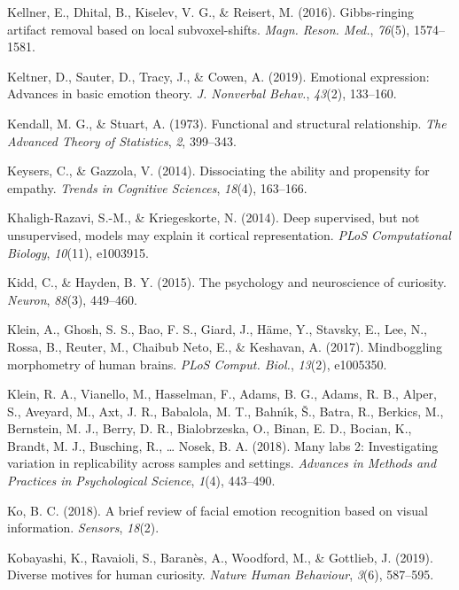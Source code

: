 \documentclass[11pt,american,a4paper,oneside,]{memoir} %
\begin{document}
\leavevmode\hypertarget{ref-Kellner2016-xb}{}%
Kellner, E., Dhital, B., Kiselev, V. G., \& Reisert, M. (2016). Gibbs-ringing artifact removal based on local subvoxel-shifts. \emph{Magn. Reson. Med.}, \emph{76}(5), 1574--1581.

\leavevmode\hypertarget{ref-Keltner2019-tm}{}%
Keltner, D., Sauter, D., Tracy, J., \& Cowen, A. (2019). Emotional expression: Advances in basic emotion theory. \emph{J. Nonverbal Behav.}, \emph{43}(2), 133--160.

\leavevmode\hypertarget{ref-kendall1973functional}{}%
Kendall, M. G., \& Stuart, A. (1973). Functional and structural relationship. \emph{The Advanced Theory of Statistics}, \emph{2}, 399--343.

\leavevmode\hypertarget{ref-keysers2014dissociating}{}%
Keysers, C., \& Gazzola, V. (2014). Dissociating the ability and propensity for empathy. \emph{Trends in Cognitive Sciences}, \emph{18}(4), 163--166.

\leavevmode\hypertarget{ref-khaligh2014deep}{}%
Khaligh-Razavi, S.-M., \& Kriegeskorte, N. (2014). Deep supervised, but not unsupervised, models may explain it cortical representation. \emph{PLoS Computational Biology}, \emph{10}(11), e1003915.

\leavevmode\hypertarget{ref-kidd2015psychology}{}%
Kidd, C., \& Hayden, B. Y. (2015). The psychology and neuroscience of curiosity. \emph{Neuron}, \emph{88}(3), 449--460.

\leavevmode\hypertarget{ref-Klein2017-su}{}%
Klein, A., Ghosh, S. S., Bao, F. S., Giard, J., Häme, Y., Stavsky, E., Lee, N., Rossa, B., Reuter, M., Chaibub Neto, E., \& Keshavan, A. (2017). Mindboggling morphometry of human brains. \emph{PLoS Comput. Biol.}, \emph{13}(2), e1005350.

\leavevmode\hypertarget{ref-Klein2018-un}{}%
Klein, R. A., Vianello, M., Hasselman, F., Adams, B. G., Adams, R. B., Alper, S., Aveyard, M., Axt, J. R., Babalola, M. T., Bahnı́k, Š., Batra, R., Berkics, M., Bernstein, M. J., Berry, D. R., Bialobrzeska, O., Binan, E. D., Bocian, K., Brandt, M. J., Busching, R., \ldots{} Nosek, B. A. (2018). Many labs 2: Investigating variation in replicability across samples and settings. \emph{Advances in Methods and Practices in Psychological Science}, \emph{1}(4), 443--490.

\leavevmode\hypertarget{ref-Ko2018-rv}{}%
Ko, B. C. (2018). A brief review of facial emotion recognition based on visual information. \emph{Sensors}, \emph{18}(2).

\leavevmode\hypertarget{ref-kobayashi2019diverse}{}%
Kobayashi, K., Ravaioli, S., Baranès, A., Woodford, M., \& Gottlieb, J. (2019). Diverse motives for human curiosity. \emph{Nature Human Behaviour}, \emph{3}(6), 587--595.
\end{document}
